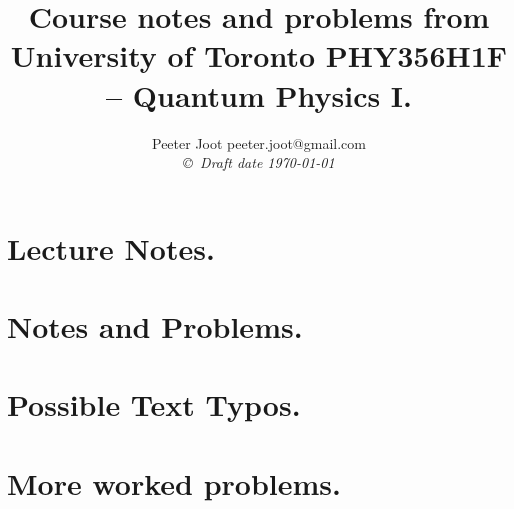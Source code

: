 \documentclass[12pt,leqno]{book}
\begin{document}

\title{Course notes and problems from University of Toronto PHY356H1F -- Quantum Physics I.}
\author{Peeter Joot  \quad peeter.joot@gmail.com \\
{\small\em \copyright \  Draft date \today }}

\maketitle

\clearpage{}
\tableofcontents

\clearpage{}

\pagestyle{plain}




\part{Lecture Notes.}


\part{Notes and Problems.}














\part{Possible Text Typos.}


\part{More worked problems.}








%




\end{document}
